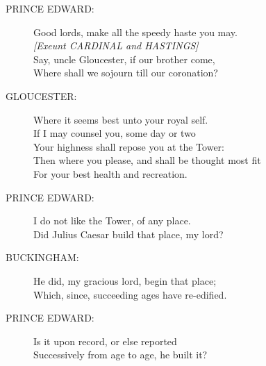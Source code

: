 \documentclass{article}
\begin{document}
\begin{description}
\item[PRINCE EDWARD:] 
\hspace{1pt}Good lords, make all the speedy haste you may.\\
{\it [Exeunt CARDINAL and HASTINGS]}\\
\hspace{1pt}Say, uncle Gloucester, if our brother come,\\
\hspace{1pt}Where shall we sojourn till our coronation?\\
\end{description}
\begin{description}
\item[GLOUCESTER:] 
\hspace{1pt}Where it seems best unto your royal self.\\
\hspace{1pt}If I may counsel you, some day or two\\
\hspace{1pt}Your highness shall repose you at the Tower:\\
\hspace{1pt}Then where you please, and shall be thought most fit\\
\hspace{1pt}For your best health and recreation.\\
\end{description}
\begin{description}
\item[PRINCE EDWARD:] 
\hspace{1pt}I do not like the Tower, of any place.\\
\hspace{1pt}Did Julius Caesar build that place, my lord?\\
\end{description}
\begin{description}
\item[BUCKINGHAM:] 
\hspace{1pt}He did, my gracious lord, begin that place;\\
\hspace{1pt}Which, since, succeeding ages have re-edified.\\
\end{description}
\begin{description}
\item[PRINCE EDWARD:] 
\hspace{1pt}Is it upon record, or else reported\\
\hspace{1pt}Successively from age to age, he built it?\\
\end{description}
\end{document}
